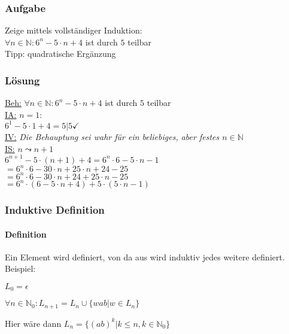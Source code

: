 \documentclass{beamer}
\begin{document}
	\begin{frame}
		\frametitle{Aufgabe}
		Zeige mittels vollständiger Induktion:\\
		$\forall n\in\mathbb{N}: 6^{n}-5\cdot n+4$ ist durch $5$ teilbar\\
		Tipp: quadratische Ergänzung\\
	\end{frame}
	\begin{frame}
		\frametitle{Lösung}
		\underline{Beh:} $\forall n\in\mathbb{N}: 6^{n}-5\cdot n+4$ ist durch $5$ teilbar\\
		\underline{IA:} $n=1:$\\
		\qquad$6^{1}-5\cdot 1+4=5\vert 5\checkmark$\\
		\underline{IV:} \emph{Die Behauptung sei wahr für ein beliebiges, aber festes $n\in\mathbb{N}$}\\
		\underline{IS:} $n\leadsto n+1$\\
		\qquad $6^{n+1}-5\cdot (n+1)+4=6^{n}\cdot 6-5\cdot n-1$\\
		\pause
		\qquad$=6^{n}\cdot 6-30\cdot n + 25\cdot n+24-25$\\
		\pause
		\qquad $=6^{n}\cdot 6-30\cdot n+24+25\cdot n-25$\\
		\pause
		\qquad $=6^{n}\cdot(6-5\cdot n+4)+5\cdot(5\cdot n-1)$\\
	\end{frame}
	\begin{frame}
		\frametitle{Induktive Definition}
		\framesubtitle{Definition}
		Ein Element wird definiert, von da aus wird induktiv jedes weitere definiert.\\
		Beispiel:\\
		\centerline{$L_{0}=\epsilon$}
		\centerline{$\forall n\in\mathbb{N}_{0}:L_{n+1}=L_{n}\cup\{wab\vert w\in L_{n}\}$}
		Hier wäre dann $L_{n}=\{(ab)^{k}\vert k\leq n,k\in\mathbb{N}_{0}\}$\\
	\end{frame}
\end{document}
